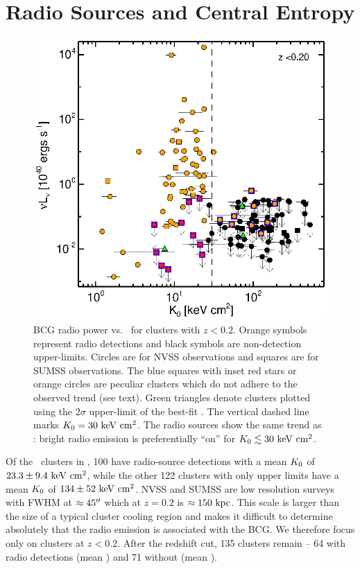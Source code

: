 \documentclass{emulateapj}
\begin{document}
\section{Radio Sources and Central Entropy}
\label{sec:agn}

\begin{figure}
  \begin{center}
    \includegraphics*[width=\columnwidth, trim=28mm 7mm 40mm 17mm, clip]{f2.eps}
    \caption{BCG radio power vs. \kna\ for clusters with $z <
      0.2$. Orange symbols represent radio detections and black
      symbols are non-detection upper-limits. Circles are for NVSS
      observations and squares are for SUMSS observations. The blue
      squares with inset red stars or orange circles are peculiar
      clusters which do not adhere to the observed trend (see text).
      Green triangles denote clusters plotted using the 2$\sigma$
      upper-limit of the best-fit \kna. The vertical dashed line marks
      $K_0 = 30 \mathrm{\mbox{\ensuremath{\mathrm{~keV}}} \mathrm{\mbox{\ensuremath{\mathrm{~cm}}}^2}}$. The radio sources show the same trend as
      \halpha: bright radio emission is preferentially ``on'' for
      $K_0 \lesssim 30 \mathrm{\mbox{\ensuremath{\mathrm{~keV}}} \mathrm{\mbox{\ensuremath{\mathrm{~cm}}}^2}}$.}
    \label{fig:radzcut}
  \end{center}
\end{figure}

Of the \clnum\ clusters in \accept, 100 have radio-source detections
with a mean $K_0$ of $23.3 \pm 9.4 \mathrm{\mbox{\ensuremath{\mathrm{~keV}}} \mathrm{\mbox{\ensuremath{\mathrm{~cm}}}^2}}$, while the other 122
clusters with only upper limits have a mean $K_0$ of $134 \pm 52
\mathrm{\mbox{\ensuremath{\mathrm{~keV}}} \mathrm{\mbox{\ensuremath{\mathrm{~cm}}}^2}}$. NVSS and SUMSS are low resolution surveys with FWHM at $\approx
45\mbox{$^{\prime\prime}$}$ which at $z = 0.2$ is $\approx 150\mbox{\ensuremath{\mathrm{~kpc}}}$. This scale is
larger than the size of a typical cluster cooling region and makes it
difficult to determine absolutely that the radio emission is
associated with the BCG. We therefore focus only on clusters at $z <
0.2$. After the redshift cut, 135 clusters remain -- 64 with radio
detections (mean \frad) and 71 without (mean \nfrad).
\end{document}
